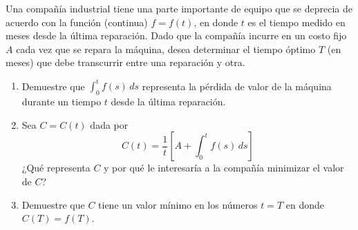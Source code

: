 \item Una compañía industrial tiene una parte importante de equipo que se deprecia de acuerdo con la función (continua) $f = f(t)$, en donde $t$ es el tiempo medido en meses desde la última reparación. Dado que la compañía incurre en un costo fijo $A$ cada vez que se repara la máquina, desea determinar el tiempo óptimo $T$ (en meses) que debe transcurrir entre una reparación y otra.
\begin{enumerate}
    \item[(a)] Demuestre que $\int_0^t f(s) \, ds$ representa la pérdida de valor de la máquina durante un tiempo $t$ desde la última reparación.
    \item[(b)] Sea $C = C(t)$ dada por
    $$C(t) = \frac{1}{t} \left[ A + \int_0^t f(s) \, ds \right]$$
    ¿Qué representa $C$ y por qué le interesaría a la compañía minimizar el valor de $C$?
    \item[(c)] Demuestre que $C$ tiene un valor mínimo en los números $t = T$ en donde $C(T) = f(T)$.
\end{enumerate}
